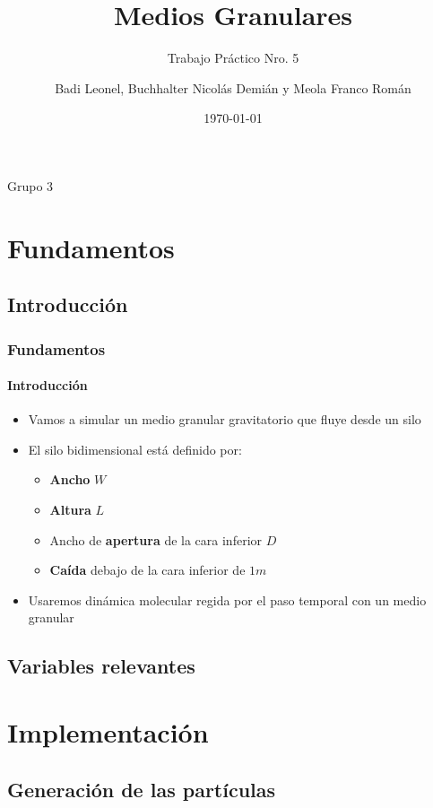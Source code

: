 \documentclass[hyperref={pdfpagelayout=SinglePage}]{beamer}
\title{Medios Granulares}
\subtitle{Trabajo Práctico Nro. 5}
\author{Badi Leonel, Buchhalter Nicolás Demián y Meola Franco Román}
\date{\today}
\makeatletter
\newcommand{\parttableofcontents}{\@starttoc{parttoc}}
\makeatother
\begin{document}


\begin{frame}[plain]
    \frametitle{} 
    \titlepage
    \centering
	Grupo 3
\end{frame}

\section{Fundamentos}

\subsection{Introducción}

\begin{frame}
\frametitle{Fundamentos}
\framesubtitle{Introducción}
\begin{itemize}
	\item Vamos a simular un medio granular gravitatorio que fluye desde un silo
	\item El silo bidimensional está definido por:
	\begin{itemize}
		\item \textbf{Ancho} $W$
		\item \textbf{Altura} $L$
		\item Ancho de \textbf{apertura} de la cara inferior $D$
		\item \textbf{Caída} debajo de la cara inferior de $1m$
	\end{itemize}
	\item Usaremos dinámica molecular regida por el paso temporal con un medio granular
\end{itemize}
\end{frame}

\subsection{Variables relevantes}

\section{Implementación}

\subsection{Generación de las partículas}
\end{document}
